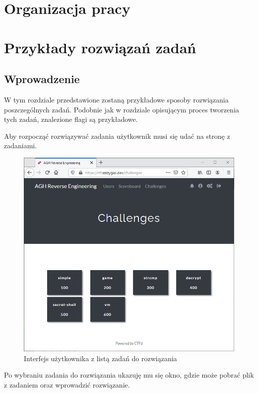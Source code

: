 \documentclass[language=polish,type=eng]{aghmodern}
\begin{document}
\chapter{Organizacja pracy}

\chapter{Przykłady rozwiązań zadań}
\label{chap:writeups}

\section{Wprowadzenie}

W tym rozdziale przedstawione zostaną przykładowe sposoby rozwiązania poszczególnych zadań.
Podobnie jak w rozdziale opisującym proces tworzenia tych zadań, znalezione
flagi są przykładowe.

Aby rozpocząć rozwiązywać zadania użytkownik musi się udać na stronę z zadaniami.

\begin{figure}[H]
\centering
\includegraphics[width=\textwidth]{ui_challenges}
\caption{Interfejs użytkownika z listą zadań do rozwiązania}
\end{figure}

Po wybraniu zadania do rozwiązania ukazuję mu się okno,
gdzie może pobrać plik z zadaniem oraz wprowadzić rozwiązanie.
\end{document}

